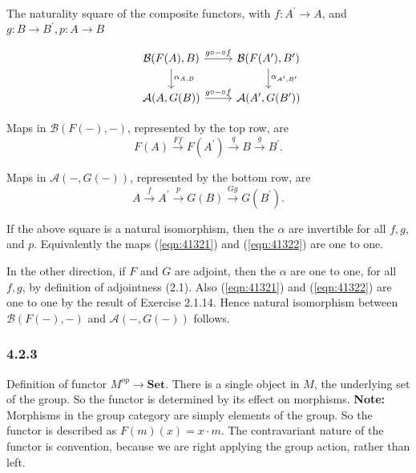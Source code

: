 \documentclass{article}
\begin{document}
The naturality square of the composite functors, with $f: A^\prime \rightarrow A$, and $g: B \rightarrow B^\prime, p\colon A\rightarrow B$

\begin{equation*}
\begin{tikzcd}
  & \mathcal{B}(F(A),B) \arrow[d,"\alpha_{A,B}"] \arrow[r, "g \circ \mathit{-} \circ f"] & \mathcal{B}(F(A^\prime),B^\prime) \arrow[d,"\alpha_{A^\prime,B^\prime}"] \\
  & \mathcal{A}(A,G(B)) \arrow[r,"g \circ \mathit{-} \circ f"] & \mathcal{A}(A^\prime,G(B^\prime))
\end{tikzcd}
\end{equation*}


Maps in $\mathcal{B}(F(\mathit{-}),\mathit{-})$, represented by the top row, are
\begin{equation}
\label{eqn:41321}
F(A) \xrightarrow{Ff} F(A^\prime)\xrightarrow{q} B\xrightarrow{g} B^\prime.
\end{equation}

Maps in $\mathcal{A}(\mathit{-},G(\mathit{-}))$, represented by the bottom row, are
\begin{equation}
\label{eqn:41322}
  A \xrightarrow{f} A^\prime \xrightarrow{p} G(B) \xrightarrow{Gg} G(B^\prime).
\end{equation}

If the above square is a natural isomorphism, then the $\alpha$ are invertible for all $f, g$, and $p$. Equivalently the maps (\ref{eqn:41321}) and (\ref{eqn:41322}) are one to one.

In the other direction, if $F$ and $G$ are adjoint, then the $\alpha$ are one to one, for all $f, g$, by definition of adjointness (2.1). Also (\ref{eqn:41321}) and (\ref{eqn:41322}) are one to one by the result of Exercise 2.1.14. Hence natural isomorphism between $\mathcal{B}(F(\mathit{-}),\mathit{-})$ and $\mathcal{A}(\mathit{-},G(\mathit{-}))$ follows.

\subsubsection*{4.2.3}

Definition of functor $M^{op} \rightarrow \mathbf{Set}$. There is a single object in $M$, the underlying set of the group. So the functor is determined by its effect on morphisms. \textbf{Note: }Morphisms in the group category are simply elements of the group. So the functor is described as $F(m)(x) = x \cdot m$. The contravariant nature of the functor is convention, because we are right applying the group action, rather than left.
\end{document}
